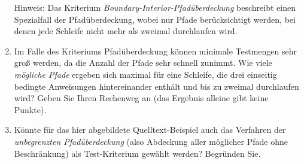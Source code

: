 \documentclass{lehramt-informatik-aufgabe}
\begin{document}
\begin{enumerate}
Hinweis: Das Kriterium \emph{Boundary-Interior-Pfadüberdeckung}
beschreibt einen Spezialfall der Pfadüberdeckung, wobei nur Pfade
berücksichtigt werden, bei denen jede Schleife nicht mehr als zweimal
durchlaufen wird.

\item Im Falle des Kriteriums Pfadüberdeckung können minimale Testmengen
sehr groß werden, da die Anzahl der Pfade sehr schnell zunimmt. Wie
viele \emph{mögliche Pfade} ergeben sich maximal für eine Schleife, die
drei einseitig bedingte Anweisungen hintereinander enthält und bis zu
zweimal durchlaufen wird? Geben Sie Ihren Rechenweg an (das Ergebnis
alleine gibt keine Punkte).

\item Könnte für das hier abgebildete Quelltext-Beispiel auch das
Verfahren der \emph{unbegrenzten Pfadüberdeckung} (also Abdeckung aller
möglicher Pfade ohne Beschränkung) als Test-Kriterium gewählt werden?
Begründen Sie.

\end{enumerate}
\end{document}
